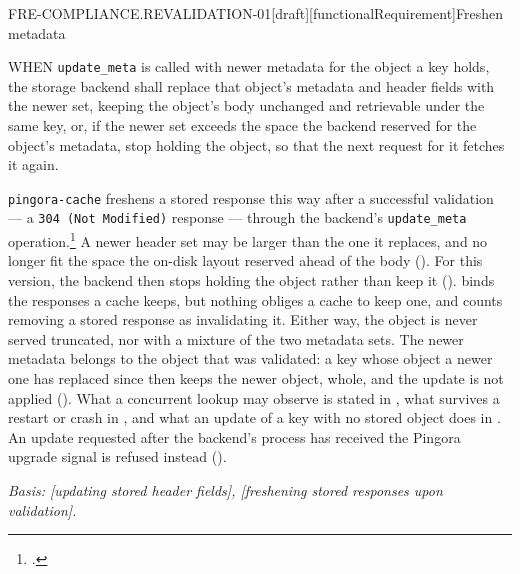 \begin{requirement}{FRE-COMPLIANCE.REVALIDATION-01}[draft][functionalRequirement]{Freshen metadata}


  WHEN \texttt{update\_meta} is called with newer metadata for the object a key
  holds, the storage backend shall replace that object's metadata and header
  fields with the newer set, keeping the object's body unchanged and
  retrievable under the same key, or, if the newer set exceeds the space the
  backend reserved for the object's metadata, stop holding the object, so
  that the next request for it fetches it again.

  \texttt{pingora-cache} freshens a stored response this way after a
  successful validation --- a \texttt{304 (Not Modified)} response --- through
  the backend's \texttt{update\_meta}
  operation.\footnote{.}
  A newer header set may be larger than the one it replaces, and no longer
  fit the space the on-disk layout reserved ahead of the body
  (). For this version, the backend then
  stops holding the object rather than keep it
  ().  binds the
  responses a cache keeps, but nothing obliges a cache to keep one, and
   counts removing a stored response as invalidating it.
  Either way, the object is never served truncated, nor with a mixture of
  the two metadata sets.
  The newer metadata belongs to the object that was validated: a key whose
  object a newer one has replaced since then keeps the newer object, whole,
  and the update is not applied ().
  What a concurrent lookup may observe is stated in
  , what survives a restart or crash in
  , and what an update of a key with no
  stored object does in . An update
  requested after the backend's process has received the Pingora upgrade signal
  is refused instead ().

  \textit{Basis: [updating stored header fields],
  [freshening stored responses upon validation].}



\end{requirement}

